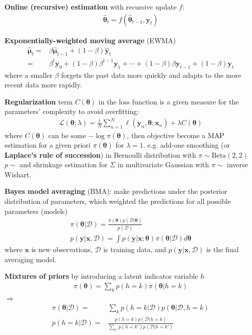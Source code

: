 \textbf{Online (recursive) estimation} with recursive update $f$:
\begin{gather}
    \hat{\bm{\theta}}_t=f(\hat{\bm{\theta}}_{t-1},\bm{y}_t)
\end{gather}

\begin{example}
    \textbf{Exponentially-weighted moving average} (EWMA)
    \begin{align}
        \hat{\bm{\mu}}_t
        =& \beta\hat{\bm{\mu}}_{t-1}+(1-\beta)\hat{\bm{y}}_t\\
        =& \beta^t\bm{y}_0 + (1-\beta)\beta^{t-1}\bm{y}_1 + \cdots + (1-\beta)\beta\bm{y}_{t-1} + (1-\beta)\bm{y}_t
    \end{align}
    where a smaller $\beta$ forgets the past data more quickly and 
    adapts to the more recent data more rapidly.
\end{example}

\textbf{Regularization} term $C(\bm{\theta})$ in the loss function is 
a given measure for the parameters' complexity to avoid overfitting:
\begin{gather}
    \mathcal{L}(\bm{\theta};\lambda)
    = \frac{1}{N}\sum_{n=1}^N\ell(\bm{y}_n,\bm{\theta};\bm{x}_n)
    + \lambda C(\bm{\theta})
\end{gather}
where $C(\bm{\theta})$ can be some $-\log{\pi(\bm{\theta})}$,
then objective become a MAP estimation for a given priori $\pi(\bm{\theta})$ for $\lambda=1$.
e.g. add-one smoothing (or \textbf{Laplace's rule of succession}) in Bernoulli distribution with $\pi\sim\text{Beta}(2,2)$ $p\sim$ and shrinkage estimation for $\Sigma$ in multivariate Gaussian with $\pi\sim$ inverse Wishart. 

\textbf{Bayes model averaging} (BMA): make predictions under the posterior distribution of parameters, which weighted the predictions for all possible parameters (models)
\begin{gather}
    \pi(\bm{\theta}|\mathcal{D})
    = \frac{\pi(\bm{\theta})p(\mathcal{D}|\bm{\theta})}{p(\mathcal{D})}\\
    p(\bm{y}|\bm{x},\mathcal{D})
    = \int{p(\bm{y}|\bm{x};\bm{\theta})\pi(\bm{\theta}|\mathcal{D})}d\bm{\theta}
\end{gather}
where $\bm{x}$ is new observations, $\mathcal{D}$ is training data, and 
$p(\bm{y}|\bm{x},\mathcal{D})$ is the final averaging model.


\textbf{Mixtures of priors} by introducing a latent indicator variable $h$
\begin{gather}
    \pi(\bm{\theta})=\sum_k p(h=k)\pi(\bm{\theta}|h=k)
\end{gather}
$\Rightarrow$
\begin{align}
    \pi(\bm{\theta}|\mathcal{D})
    =& \sum_k{p(h=k|\mathcal{D})p(\bm{\theta}|\mathcal{D},h=k)}\\
    p(h=k|\mathcal{D})
    =& \frac{p(h=k)p(\mathcal{D}|h=k)}{\sum_{k'}{p(h=k')p(\mathcal{D}|h=k')}}
\end{align}


